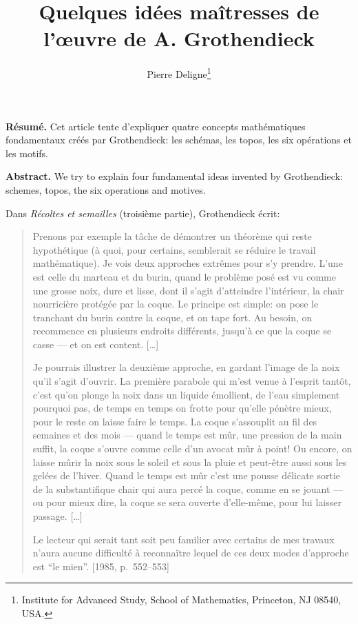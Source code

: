 \documentclass[11pt,a4paper]{article}
\title{\textbf{Quelques id\'ees ma\^itresses de l'\oe uvre de A. Grothendieck}}
\author{Pierre Deligne\footnote{Institute for Advanced Study, School of Mathematics, Princeton, NJ 08540, USA.}}
\date{}
\theoremstyle{plain}
\theoremstyle{definition}
\begin{document}
\maketitle

\noindent\textbf{R\'esum\'e.} Cet article tente d'expliquer quatre concepts math\'ematiques fondamentaux cr\'e\'es par Grothendieck: les sch\'emas, les topos, les six op\'erations et les motifs.

\medskip
\noindent\textbf{Abstract.} We try to explain four fundamental ideas invented by Grothendieck: schemes, topos, the six operations and motives.

\bigskip
\noindent Dans \emph{R\'ecoltes et semailles} (troisi\`eme partie), Grothendieck \'ecrit:

\begin{quote}
\guillemotleft Prenons par exemple la t\^ache de d\'emontrer un th\'eor\`eme qui reste hypoth\'etique (\`a quoi, pour certains, semblerait se r\'eduire le travail math\'ematique). Je vois deux approches extr\^emes pour s'y prendre. L'une est celle du marteau et du burin, quand le probl\`eme pos\'e est vu comme une grosse noix, dure et lisse, dont il s'agit d'atteindre l'int\'erieur, la chair nourrici\`ere prot\'eg\'ee par la coque. Le principe est simple: on pose le tranchant du burin contre la coque, et on tape fort. Au besoin, on recommence en plusieurs endroits diff\'erents, jusqu'\`a ce que la coque se casse --- et on est content. {[}\ldots{]}

\guillemotleft Je pourrais illustrer la deuxi\`eme approche, en gardant l'image de la noix qu'il s'agit d'ouvrir. La premi\`ere parabole qui m'est venue \`a l'esprit tant\^ot, c'est qu'on plonge la noix dans un liquide \'emollient, de l'eau simplement pourquoi pas, de temps en temps on frotte pour qu'elle p\'en\`etre mieux, pour le reste on laisse faire le temps. La coque s'assouplit au fil des semaines et des mois --- quand le temps est m\^ur, une pression de la main suffit, la coque s'ouvre comme celle d'un avocat m\^ur \`a point! Ou encore, on laisse m\^urir la noix sous le soleil et sous la pluie et peut-\^etre aussi sous les gel\'ees de l'hiver. Quand le temps est m\^ur c'est une pousse d\'elicate sortie de la substantifique chair qui aura perc\'e la coque, comme en se jouant --- ou pour mieux dire, la coque se sera ouverte d'elle-m\^eme, pour lui laisser passage. {[}\ldots{]}

\guillemotleft Le lecteur qui serait tant soit peu familier avec certains de mes travaux n'aura aucune difficult\'e \`a reconna\^itre lequel de ces deux modes d'approche est ``le mien''.\guillemotright{} [1985, p.~552--553]
\end{quote}
\end{document}
